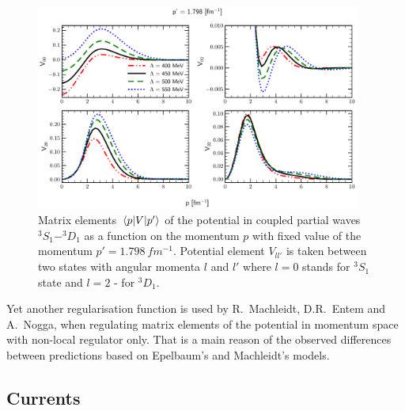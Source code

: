 \begin{figure}[htb]
    \begin{center}
    \includegraphics[width=0.95\textwidth]{PlotData/Deuteron/WAVEFUNC/potential_pp1.798.pdf}
    \end{center}
    \caption{Matrix elements $\matrixel{p}{V}{p^\prime}$ of the potential in
    coupled partial waves $^3S_1 - ^3D_1$ as a function on the momentum $p$ with fixed
    value of the momentum $p'=\SI{1.798}{fm^{-1}}$. Potential element $V_{ll'}$
    is taken between two states with angular momenta  $l$ and $l'$ where $l=0$
    stands  for $^3S_1$ state and $l=2$ - for $^3D_1$. 
    }
    \label{potential_cutoff}
\end{figure}




Yet another regularisation function  is used by R.~Machleidt, D.R.~Entem and A.~Nogga, 
when regulating matrix elements of the potential in momentum space with non-local regulator only.
That is a main reason of the observed differences between predictions based on Epelbaum's
and Machleidt's models. 

\subsection*{Currents}
 
